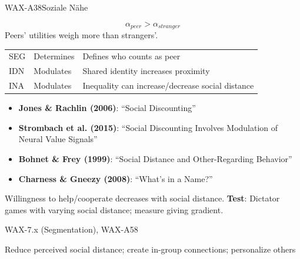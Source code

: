 \begin{axiomspec}{WAX-A38}{Soziale Nähe}

\begin{equation}
\alpha_{peer} > \alpha_{stranger}
\end{equation}
Peers' utilities weigh more than strangers'.

\begin{tabular}{lll}
SEG & Determines & Defines who counts as peer \\
IDN & Modulates & Shared identity increases proximity \\
INA & Modulates & Inequality can increase/decrease social distance \\
\end{tabular}

\begin{itemize}
\item \textbf{Jones \& Rachlin (2006)}: ``Social Discounting''
\item \textbf{Strombach et al. (2015)}: ``Social Discounting Involves Modulation of Neural Value Signals''
\item \textbf{Bohnet \& Frey (1999)}: ``Social Distance and Other-Regarding Behavior''
\item \textbf{Charness \& Gneezy (2008)}: ``What's in a Name?''
\end{itemize}

Willingness to help/cooperate decreases with social distance.
\textbf{Test}: Dictator games with varying social distance; measure giving gradient.

WAX-7.x (Segmentation), WAX-A58

Reduce perceived social distance; create in-group connections; personalize others

\end{axiomspec}


